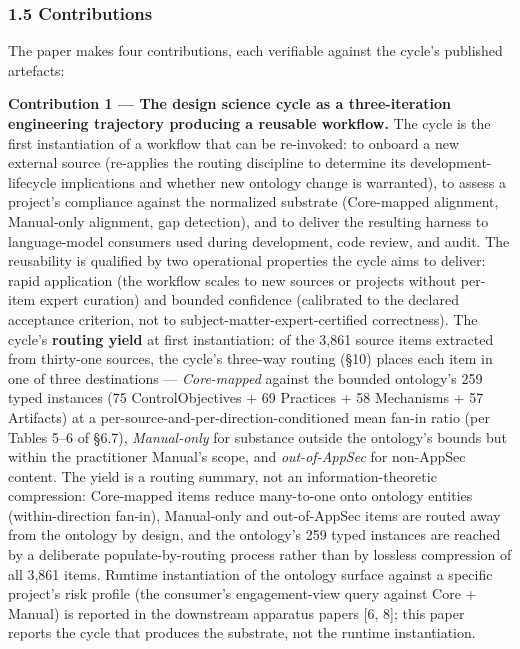 \documentclass[
]{article}
\begin{document}
\subsubsection{1.5 Contributions}\label{contributions}

The paper makes four contributions, each verifiable against the cycle's
published artefacts:

\textbf{Contribution 1 --- The design science cycle as a three-iteration
engineering trajectory producing a reusable workflow.} The cycle is the
first instantiation of a workflow that can be re-invoked: to onboard a
new external source (re-applies the routing discipline to determine its
development-lifecycle implications and whether new ontology change is
warranted), to assess a project's compliance against the normalized
substrate (Core-mapped alignment, Manual-only alignment, gap detection),
and to deliver the resulting harness to language-model consumers used
during development, code review, and audit. The reusability is qualified
by two operational properties the cycle aims to deliver: rapid
application (the workflow scales to new sources or projects without
per-item expert curation) and bounded confidence (calibrated to the
declared acceptance criterion, not to subject-matter-expert-certified
correctness). The cycle's \textbf{routing yield} at first instantiation:
of the 3,861 source items extracted from thirty-one sources, the cycle's
three-way routing (§10) places each item in one of three destinations
--- \emph{Core-mapped} against the bounded ontology's 259 typed
instances (75 ControlObjectives + 69 Practices + 58 Mechanisms + 57
Artifacts) at a per-source-and-per-direction-conditioned mean fan-in
ratio (per Tables 5--6 of §6.7), \emph{Manual-only} for substance
outside the ontology's bounds but within the practitioner Manual's
scope, and \emph{out-of-AppSec} for non-AppSec content. The yield is a
routing summary, not an information-theoretic compression: Core-mapped
items reduce many-to-one onto ontology entities (within-direction
fan-in), Manual-only and out-of-AppSec items are routed away from the
ontology by design, and the ontology's 259 typed instances are reached
by a deliberate populate-by-routing process rather than by lossless
compression of all 3,861 items. Runtime instantiation of the ontology
surface against a specific project's risk profile (the consumer's
engagement-view query against Core + Manual) is reported in the
downstream apparatus papers {[}6, 8{]}; this paper reports the cycle
that produces the substrate, not the runtime instantiation.
\end{document}
